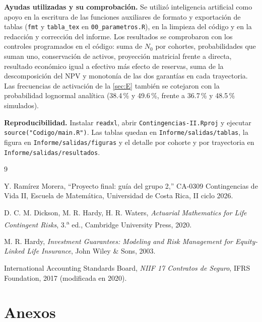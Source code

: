 \documentclass[10pt,a4paper]{article}
\numberwithin{equation}{section}
\begin{document}
	\textbf{Ayudas utilizadas y su comprobación.} Se utilizó inteligencia artificial como apoyo en la escritura de las funciones auxiliares de formato y exportación de tablas (\texttt{fmt} y \texttt{tabla\_tex} en \texttt{00\_parametros.R}), en la limpieza del código y en la redacción y corrección del informe. Los resultados se comprobaron con los controles programados en el código: suma de \(N_0\) por cohortes, probabilidades que suman uno, conservación de activos, proyección matricial frente a directa, resultado económico igual a efectivo más efecto de reservas, suma de la descomposición del NPV y monotonía de las dos garantías en cada trayectoria. Las frecuencias de activación de la \cref{sec:E} también se cotejaron con la probabilidad lognormal analítica (38.4\,\% y 49.6\,\%, frente a 36.7\,\% y 48.5\,\% simulados).

	\textbf{Reproducibilidad.} Instalar \texttt{readxl}, abrir \texttt{Contingencias-II.Rproj} y ejecutar \texttt{source("Codigo/main.R")}. Las tablas quedan en \texttt{Informe/salidas/tablas}, la figura en \texttt{Informe/salidas/figuras} y el detalle por cohorte y por trayectoria en \texttt{Informe/salidas/resultados}.

	\begin{thebibliography}{9}\small

		Y. Ramírez Morera, ``Proyecto final: guía del grupo 2,'' CA-0309 Contingencias de Vida II, Escuela de Matemática, Universidad de Costa Rica, II ciclo 2026.

		D. C. M. Dickson, M. R. Hardy, H. R. Waters, \emph{Actuarial Mathematics for Life Contingent Risks}, 3.\textsuperscript{a} ed., Cambridge University Press, 2020.

		M. R. Hardy, \emph{Investment Guarantees: Modeling and Risk Management for Equity-Linked Life Insurance}, John Wiley \& Sons, 2003.

		International Accounting Standards Board, \emph{NIIF 17 Contratos de Seguro}, IFRS Foundation, 2017 (modificada en 2020).

	\end{thebibliography}

	\clearpage
	\section*{Anexos}\label{sec:anexos}
\end{document}
